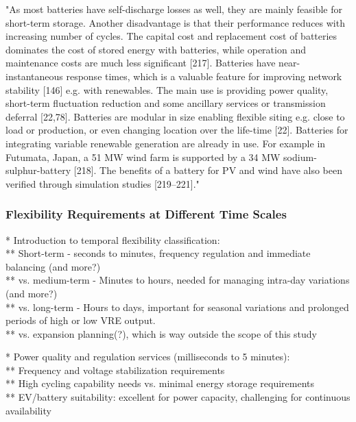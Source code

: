 "As most batteries have self-discharge losses as well, they are mainly feasible for short-term storage. Another disadvantage is that their performance reduces with increasing number of cycles. The capital cost and replacement cost of batteries dominates the cost of stored energy with batteries, while operation and maintenance costs are much less significant [217]. Batteries have near-instantaneous response times, which is a valuable feature for improving network stability [146] e.g. with renewables. The main use is providing power quality, short-term fluctuation reduction and some ancillary services or transmission deferral [22,78]. Batteries are modular in size enabling flexible siting e.g. close to load or production, or even changing location over the life-time [22]. Batteries for integrating variable renewable generation are already in use. For example in Futumata, Japan, a 51 MW wind farm is supported by a 34 MW sodium-sulphur-battery [218]. The benefits of a battery for PV and wind have also been verified through simulation studies [219–221]." \cite{lund_review_2015}



\subsubsection{Flexibility Requirements at Different Time Scales}

* Introduction to temporal flexibility classification: \\
** Short-term - seconds to minutes, frequency regulation and immediate balancing (and more?) \\
** vs. medium-term - Minutes to hours, needed for managing intra-day variations (and more?) \\
** vs. long-term - Hours to days, important for seasonal variations and prolonged periods of high or low VRE output. \\
** vs. expansion planning(?), which is way outside the scope of this study

* Power quality and regulation services (milliseconds to 5 minutes): \\
** Frequency and voltage stabilization requirements \\
** High cycling capability needs vs. minimal energy storage requirements \\
** EV/battery suitability: excellent for power capacity, challenging for continuous availability

